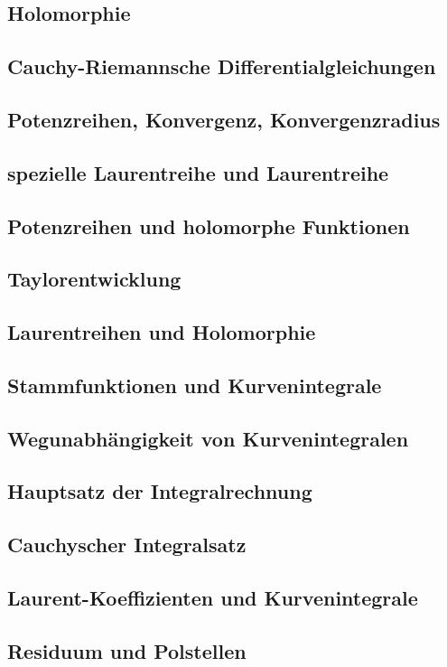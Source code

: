\documentclass[a4paper]{article}
\begin{document}
\subsection{Holomorphie}
\subsection{Cauchy-Riemannsche Differentialgleichungen}
\subsection{Potenzreihen, Konvergenz, Konvergenzradius}
\subsection{spezielle Laurentreihe und Laurentreihe}
\subsection{Potenzreihen und holomorphe Funktionen}
\subsection{Taylorentwicklung}
\subsection{Laurentreihen und Holomorphie}
\subsection{Stammfunktionen und Kurvenintegrale}
\subsection{Wegunabhängigkeit von Kurvenintegralen}
\subsection{Hauptsatz der Integralrechnung}
\subsection{Cauchyscher Integralsatz}
\subsection{Laurent-Koeffizienten und Kurvenintegrale}
\subsection{Residuum und Polstellen}
\end{document}

